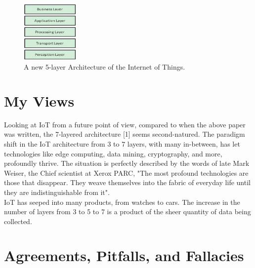 \documentclass[12pt,a4paper, india]{article}
\begin{document}
 \begin{figure}[h]
    \centering
    \includegraphics[width=0.25\textwidth]{5 Layer Architecture.png}
    \caption{A new 5-layer Architecture of the Internet of Things.}
\end{figure}

\section{My Views}

    Looking at IoT from a future point of view, compared to when the above paper was written, the 7-layered architecture [1] seems second-natured. The paradigm shift in the IoT architecture from 3 to 7 layers, with many in-between, has let technologies like edge computing, data mining, cryptography, and more, profoundly thrive. The situation is perfectly described by the words of late Mark Weiser, the Chief scientist at Xerox PARC,  "The most profound technologies are those that disappear. They weave themselves into the fabric of everyday life until they are indistinguishable from it". \\
    
    IoT has seeped into many products, from watches to cars. The increase in the number of layers from 3 to 5 to 7 is a product of the sheer quantity of data being collected. 
    \\

\section{Agreements, Pitfalls, and Fallacies}
\end{document}

